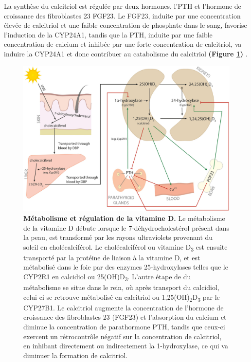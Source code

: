 \documentclass[
  a4paper,
  DIV=11,
  numbers=noendperiod,
  listof=totoc]{scrreprt}
\begin{document}
La synthèse du calcitriol est régulée par deux hormones, l'\ac{PTH} et
l'hormone de croissance des fibroblastes 23 \acs{FGF23}. Le \ac{FGF23},
induite par une concentration élevée de calcitriol et une faible
concentration de phosphate dans le sang, favorise l'induction de la
\ac{CYP24A1}, tandis que la \ac{PTH}, induite par une faible
concentration de calcium et inhibée par une forte concentration de
calcitriol, va induire la \ac{CYP24A1} et donc contribuer au catabolisme
du calcitriol \textbf{(Figure \ref{fig:reg-vitd})}
\autocite{Dankers.2017,Christakos.2010}.

\begin{figure}
\includegraphics{figures/vitamin-d-metabolism-regulation.jpg} 
\caption[\textbf{Métabolisme et régulation de la vitamine D.}]{\textbf{Métabolisme et régulation de la vitamine D.} Le métabolisme de la vitamine D débute lorsque le 7-déhydrocholestérol présent dans la peau, est transformé par les rayons ultraviolets provenant du soleil en cholécalciférol. Le cholécalciférol ou vitamine D\textsubscript{3} est ensuite transporté par la protéine de liaison à la vitamine D, et est métabolisé dans le foie par des enzymes 25-hydroxylases telles que le CYP2R1 en calcidiol ou 25(OH)D\textsubscript{3}. L'autre étape de du métabolisme se situe dans le rein, où après transport du calcidiol, celui-ci se retrouve métabolisé en calcitriol ou 1,25(OH)\textsubscript{2}D\textsubscript{3} par le CYP27B1. Le calcitriol augmente la concentration de l'hormone de croissance des fibroblastes 23 (FGF23) et l'absorption du calcium et diminue la concentration de parathormone \ac{PTH}, tandis que ceux-ci exercent un rétrocontrôle négatif sur la concentration de calcitriol, en inhibant directement ou indirectement la 1-hydroxylase, ce qui va diminuer la formation de calcitriol. \cite{Dankers.2017}}
\label{fig:reg-vitd}
\end{figure}
\end{document}
